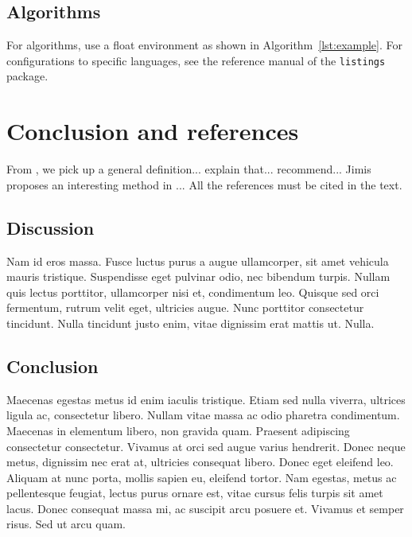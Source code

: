 \documentclass{jimis-final-en}
\begin{document}
\subsection{Algorithms}

For algorithms, use a float environment as shown in Algorithm~\ref{lst:example}. For configurations to specific languages, see the reference manual of the \texttt{listings} package.

\section{Conclusion and references}
From \citet{sinclair91corpus}, we pick up a general definition... \citet{ounis00flidar} explain that... \citet{wood92artifacts} recommend... Jimis proposes an interesting method in \citet{jimis}... All the references must be cited in the text.

\nocite{hentschel07acceptance,biodiversa,pubmed,antonymy02perspective,justeson01cooccurence,r-project,perotti2015,petrone:hal-01191886}

\subsection{Discussion}
Nam id eros massa. Fusce luctus purus a augue ullamcorper, sit amet vehicula mauris
tristique. Suspendisse eget pulvinar odio, nec bibendum turpis. Nullam quis lectus porttitor,
ullamcorper nisi et, condimentum leo. Quisque sed orci fermentum, rutrum velit eget, ultricies
augue. Nunc porttitor consectetur tincidunt. Nulla tincidunt justo enim, vitae dignissim erat
mattis ut. Nulla.

\subsection{Conclusion}
Maecenas egestas metus id enim iaculis tristique. Etiam sed nulla viverra, ultrices ligula ac,
consectetur libero. Nullam vitae massa ac odio pharetra condimentum. Maecenas in
elementum libero, non gravida quam. Praesent adipiscing consectetur consectetur. Vivamus at
orci sed augue varius hendrerit. Donec neque metus, dignissim nec erat at, ultricies consequat
libero. Donec eget eleifend leo. Aliquam at nunc porta, mollis sapien eu, eleifend tortor. Nam
egestas, metus ac pellentesque feugiat, lectus purus ornare est, vitae cursus felis turpis sit amet
lacus. Donec consequat massa mi, ac suscipit arcu posuere et. Vivamus et semper risus. Sed ut
arcu quam.
\end{document}

